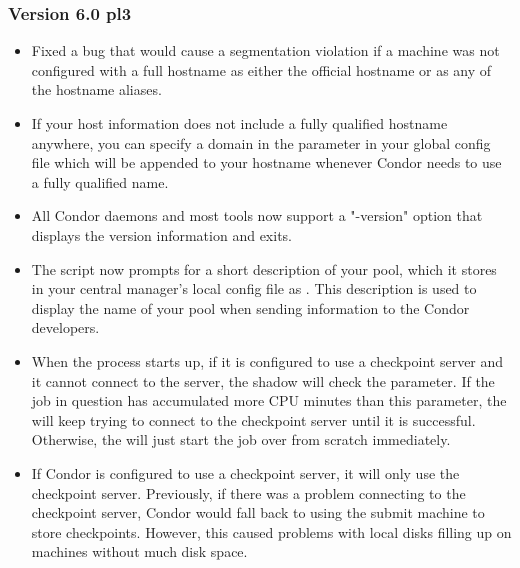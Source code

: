 \subsubsection{\label{sec:New-6-0-pl3}Version 6.0 pl3}

\begin{itemize}

\item Fixed a bug that would cause a segmentation violation if a
machine was not configured with a full hostname as either the official
hostname or as any of the hostname aliases.

\item If your host information does not include a fully qualified
hostname anywhere, you can specify a domain in the
 parameter in your global config file
which will be appended to your hostname whenever Condor needs to use a
fully qualified name.

\item All Condor daemons and most tools now support a "-version"
option that displays the version information and exits.

\item The  script now prompts for a short description
of your pool, which it stores in your central manager's local config
file as .
This description is used to display the name of your pool when sending
information to the Condor developers.

\item When the  process starts up, if it is configured
to use a checkpoint server and it cannot connect to the server, the
shadow will check the  parameter.  
If the job in question has accumulated more CPU minutes than this
parameter, the  will keep trying to connect to the
checkpoint server until it is successful.
Otherwise, the  will just start the job over from
scratch immediately.

\item If Condor is configured to use a checkpoint server, it will only
use the checkpoint server.
Previously, if there was a problem connecting to the checkpoint
server, Condor would fall back to using the submit machine to store
checkpoints.
However, this caused problems with local disks filling up on machines
without much disk space.


\end{itemize}
